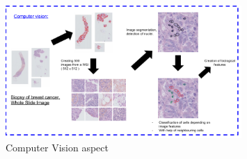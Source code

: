 \documentclass[a4paper,10pt,twocolumn]{article}
\begin{document}
\begin{figure}[!ht]
\centering
\includegraphics[width=0.8\textwidth]{ComputerVision.png}
\caption{Computer Vision aspect}
\label{fig:ComputerVision}
\end{figure}
\end{document}
